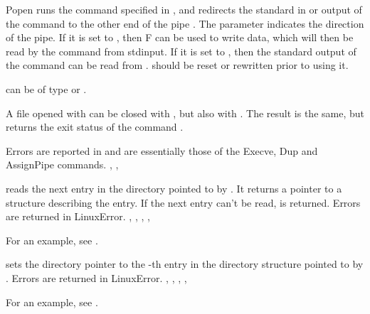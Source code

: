 { Popen runs the command specified in ,
 and redirects the standard in or output of the
command to the other end of the pipe . The parameter 
indicates the direction of the pipe. If it is set to , then F can
be used to write data, which will then be read by the command from stdinput.
If it is set to , then the standard output of the command can be 
read from .  should be reset or rewritten prior to using it.

 can be of type  or .

A file opened with  can be closed with , but also
with . The result is the same, but  returns the
exit status of the command .}
{Errors are reported in  and are essentially those of the
Execve, Dup and AssignPipe commands.
}
{, , }



{ reads the next entry in the directory pointed to by .
It returns a  pointer to a structure describing the entry.
If the next entry can't be read,  is returned.
}
{Errors are returned in LinuxError.}
{, , , ,
}

For an example, see .

{  sets the directory pointer to the -th entry in the
directory structure pointed to by .}
{Errors are returned in LinuxError.}
{, , , ,
}

For an example, see .

